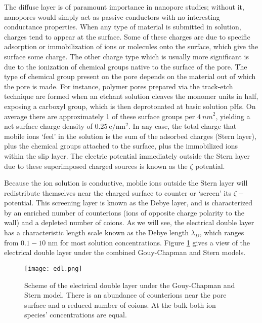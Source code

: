 			The diffuse layer is of paramount importance in nanopore studies; without it, nanopores would simply act as passive conductors with no interesting conductance properties. When any type of material is submitted in solution, charges tend to appear at the surface. Some of these charges are due to specific adsorption or immobilization of ions or molecules onto the surface, which give the surface some charge. The other charge type which is usually more significant is due to the ionization of chemical groups native to the surface of the pore. The type of chemical group present on the pore depends on the material out of which the pore is made. For instance, polymer pores prepared via the track-etch technique are formed when an etchant solution cleaves the monomer units in half, exposing a carboxyl group, which is then deprotonated at basic solution pHs. On average there are approximately 1 of these surface groups per $\SI{4}{nm}^{2}$, yielding a net surface charge density of $0.25~\mathrm{e}/\mathrm{nm}^{2}$. In any case, the total charge that mobile ions `feel' in the solution is the sum of the adsorbed charges (Stern layer), plus the chemical groups attached to the surface, plus the immobilized ions within the slip layer. The electric potential immediately outside the Stern layer due to these superimposed charged sources is known as the $\zeta$ potential.
			
			Because the ion solution is conductive, mobile ions outside the Stern layer will redistribute themselves near the charged surface to counter or `screen' its $\zeta-$potential. This screening layer is known as the Debye layer, and is characterized by an enriched number of counterions (ions of opposite charge polarity to the wall) and a depleted number of coions. As we will see, the electrical double layer has a characteristic length scale known as the Debye length $\lambda_{D}$, which ranges from $0.1-10$ nm for most solution concentrations. Figure \ref{fig:edl} gives a view of the electrical double layer under the combined Gouy-Chapman and Stern models. 
			
			\begin{figure} \label{fig:edl}
				\texttt{[image: edl.png]}
				\caption{Scheme of the electrical double layer under the Gouy-Chapman and Stern model. There is an abundance of counterions near the pore surface and a reduced number of coions. At the bulk both ion species' concentrations are equal.}
			\end{figure}

			
			
